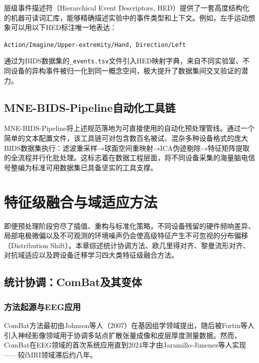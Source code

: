 \documentclass[12pt, a4paper]{article}
\begin{document}
层级事件描述符（Hierarchical Event Descriptors, HED）\citep{Niso2022HED}提供了一套高度结构化的机器可读词汇库，能够精确描述实验中的事件类型和上下文。例如，左手运动想象可以用以下HED标注唯一地表达：

\begin{center}
\texttt{Action/Imagine/Upper-extremity/Hand, Direction/Left}
\end{center}

通过为BIDS数据集的\texttt{\_events.tsv}文件引入HED映射字典，来自不同实验室、不同设备的异构事件被归一化到同一概念空间，极大提升了数据集间交叉验证的潜力。

\subsection{MNE-BIDS-Pipeline自动化工具链}

MNE-BIDS-Pipeline将上述规范落地为可直接使用的自动化预处理管线。通过一个简单的文本配置文件，该工具链可对包含数百名被试、混杂多种设备格式的庞大BIDS数据集执行：滤波重采样→球面空间重映射→ICA伪迹剔除→特征矩阵提取的全流程并行化批处理。这标志着在数据工程层面，将不同设备采集的海量脑电信号整编为标准可用数据集已具备坚实的工具支撑。

\section{特征级融合与域适应方法}
\label{sec:feature}

即便预处理阶段穷尽了插值、重构与标准化策略，不同设备残留的硬件频响差异、局部电极微偏以及不可观测的环境噪声仍会使高级特征产生不可忽视的分布偏移（Distribution Shift）。本章综述统计协调方法、欧几里得对齐、黎曼流形对齐、对抗域适应以及跨设备迁移学习四大类特征级融合方法。

\subsection{统计协调：ComBat及其变体}

\subsubsection{方法起源与EEG应用}

ComBat方法最初由Johnson等人（2007）在基因组学领域提出\citep{Johnson2007ComBat}，随后被Fortin等人引入神经影像领域用于协调多站点扩散张量成像和皮层厚度测量数据\citep{Fortin2017DTI, Fortin2018cortical}。然而，ComBat在EEG领域的首次系统应用直到2024年才由Jaramillo-Jimenez等人实现\citep{Jaramillo2024ComBat}——较fMRI领域滞后约八年。
\end{document}
